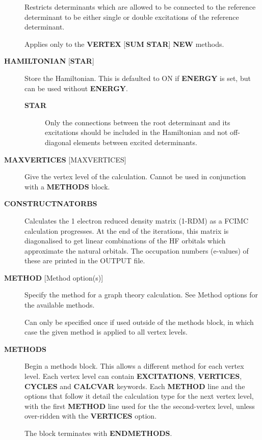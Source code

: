 \documentclass[openany,a4paper,10pt]{manual}
\begin{document}
\begin{description}
Restricts determinants which are allowed to be connected to the
reference determinant to be either single or double excitations of
the reference determinant.

Applies only to the \textbf{VERTEX} {[}\textbf{SUM} \textbf{STAR}{]} \textbf{NEW} methods.

\item[\textbf{HAMILTONIAN} {[}\textbf{STAR}{]}]
Store the Hamiltonian.  This is defaulted to ON if \textbf{ENERGY} is set,
but can be used without \textbf{ENERGY}.
\begin{description}
\item[\textbf{STAR}]
Only the connections between the root determinant and its
excitations should be included in the Hamiltonian and not
off-diagonal elements between excited determinants.

\end{description}

\item[\textbf{MAXVERTICES} {[}MAXVERTICES{]}]
Give the vertex level of the calculation.  Cannot be used in
conjunction with a \textbf{METHODS} block.

\item[\textbf{CONSTRUCTNATORBS}]
Calculates the 1 electron reduced density matrix (1-RDM) as a FCIMC
calculation progresses.  At the end of the iterations, this matrix
is diagonalised to get linear combinations of the HF orbitals which
approximate the natural orbitals.  The occupation numbers (e-values)
of these are printed in the OUTPUT file.

\item[\textbf{METHOD} {[}Method option(s){]}]
Specify the method for a graph theory calculation.  See Method
options for the available methods.

Can only be specified once if used outside of the methods block,
in which case the given method is applied to all vertex levels.

\item[\textbf{METHODS}]
Begin a methods block.  This allows a different method for each vertex
level.  Each vertex level can contain \textbf{EXCITATIONS}, \textbf{VERTICES},
\textbf{CYCLES} and \textbf{CALCVAR} keywords.
Each \textbf{METHOD} line and the options that follow it detail the calculation
type for the next vertex level, with the first \textbf{METHOD} line used for the
the second-vertex level, unless over-ridden with the \textbf{VERTICES} option.

The block terminates with \textbf{ENDMETHODS}.


\end{description}
\end{document}
